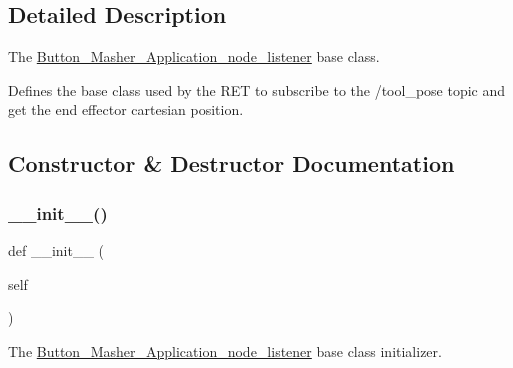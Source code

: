 \subsection{Detailed Description}
The \hyperlink{classButton__Masher__Application__Output_1_1Button__Masher__Application__node__listener}{Button\+\_\+\+Masher\+\_\+\+Application\+\_\+node\+\_\+listener} base class. 

Defines the base class used by the R\+ET to subscribe to the /tool\+\_\+pose topic and get the end effector cartesian position. 

\subsection{Constructor \& Destructor Documentation}
\mbox{\label{classButton__Masher__Application__Output_1_1Button__Masher__Application__node__listener_ae64f0875afe3067b97ba370b354b9213}} 
\subsubsection{\texorpdfstring{\+\_\+\+\_\+init\+\_\+\+\_\+()}{\_\_init\_\_()}}
{\footnotesize\ttfamily def \+\_\+\+\_\+init\+\_\+\+\_\+ (\begin{DoxyParamCaption}\item[{}]{self }\end{DoxyParamCaption})}



The \hyperlink{classButton__Masher__Application__Output_1_1Button__Masher__Application__node__listener}{Button\+\_\+\+Masher\+\_\+\+Application\+\_\+node\+\_\+listener} base class initializer. 



